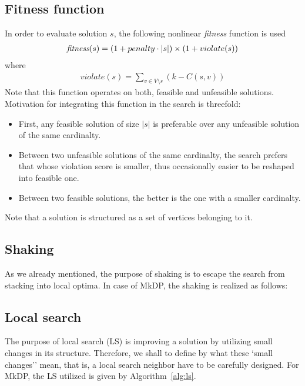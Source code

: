 \documentclass[sigconf]{acmart}
\begin{document}
   \subsection{Fitness function}
       In order to evaluate solution $s$, the following nonlinear \emph{fitness} function is used 
       \begin{align}
          \emph{fitness}(s) = ( 1+ penalty \cdot |s|) \times ( 1 + violate(s))
       \end{align}
       where 
       \begin{align}
       	   violate(s) = \sum_{v \in V \setminus s} ( k - C(s, v) ) 
       \end{align}
   Note that this function operates on both, feasible and unfeasible solutions. 
       Motivation for integrating this function  in the search is threefold:
       \begin{itemize}
       	\item First, any feasible solution of size $|s|$ is preferable over any unfeasible solution of the same cardinalty. 
       	\item Between two unfeasible solutions of the same cardinalty, the search prefers that whose violation score is smaller, thus occasionally easier to be reshaped into   feasible one.  
       	\item Between two feasible solutions, the better is the one with a smaller cardinalty. 
       \end{itemize}
     Note that a solution is structured as a set of vertices belonging to it. 
   
   \subsection{Shaking}
    As we already mentioned, the purpose of shaking is to escape the search from stacking into   local optima. In case of MkDP, the shaking is realized as follows:  
   \subsection{Local search}
  The purpose of local search (LS) is improving a solution by utilizing small changes in its structure. Therefore, we shall to define by what these `small changes'' mean, that is, a local search neighbor have to be carefully designed.  For MkDP, the LS utilized is given by Algorithm~\ref{alg:ls}.
  
\end{document}

